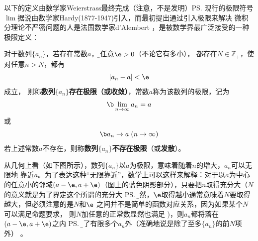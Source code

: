 以下的定义由数学家Weierstrass最终完成（注意，不是发明）\ps{现行的极限符号
$\lim$据说由数学家Hardy(1877-1947)引入，而最初提出通过引入极限来解决
微积分理论不严密问题的人是法国数学家d'Alembert}
，是被数学界最广泛接受的一种极限定义：

\begin{thx}
	对于数列$\{a_n\}$，若存在常数$a$，{\b 对任意$\e>0$（不论它有多小），
	都存在$N\in\mathbb{Z}_+$，使对任意$n>N$，都有
	$$|a_n-a|<\e$$
	成立}，
	则称{\bf 数列$\{a_n\}$存在极限（或收敛）}，常数$a$称为该数列的极限，记为
	$$\b\lim_{n\to\infty}a_n=a$$
	或%
	$$\b a_n\to a\;(n\to\infty)$$
	若上述常数$a$不存在，则称{\bf 数列$\{a_n\}$不存在极限}（或{\bf 发散}）。	
\end{thx}

从几何上看（如下图所示），数列$\{a_n\}$以$a$为极限，意味着随着$n$的增大，$a_n$可以无限地
靠近$a$。为了表达这种“无限靠近”，数学上可以这样来解释：对于以$a$为中心的任意小的邻域$(a-\e,
a+\e)$（图上的蓝色阴影部分），只要把$n$取得充分大（$N$的意义就是为了界定这个所谓的充分大
\ps{\b 显然，$\e$取得越小通常意味着$N$要取得越大，但必须注意的是$N$和$\e$
之间并不是简单的函数对应关系，因为如果某个$N$可以满足命题要求，
则$N$加任意的正常数显然也满足}
)，则$a_n$都将落在$(a-\e,a+\e)$之内
\ps{\b 除了有限多个$a_n$外（准确地说是除了至多$\{a_n\}$的前$N$项外）}
。

